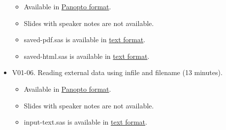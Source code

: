 \documentclass[
]{article}
\providecommand{\tightlist}{%
  \setlength{\itemsep}{0pt}\setlength{\parskip}{0pt}}
\begin{document}
\begin{itemize}
  \begin{itemize}
  \tightlist
  \item
    Available in
    \href{https://umkc.hosted.panopto.com/Panopto/Pages/Viewer.aspx?id=cebf1a98-06bf-41e0-9be1-aa7301384dc6}{Panopto
    format}.
  \item
    Slides with speaker notes are not available.
  \item
    saved-pdf.sas is available in
    \href{https://github.com/pmean/introduction-to-SAS/tree/master/basics1/src/saved-pdf.sas}{text
    format}.
  \item
    saved-html.sas is available in
    \href{https://github.com/pmean/introduction-to-SAS/tree/master/basics1/src/saved-html.sas}{text
    format}.
  \end{itemize}
\item
  V01-06. Reading external data using infile and filename (13 minutes).

  \begin{itemize}
  \tightlist
  \item
    Available in
    \href{https://umkc.hosted.panopto.com/Panopto/Pages/Viewer.aspx?id=faeefa60-c4ed-4d5b-a959-aa73013ea6af}{Panopto
    format}.
  \item
    Slides with speaker notes are not available.
  \item
    input-text.sas is available in
    \href{https://github.com/pmean/introduction-to-SAS/tree/master/basics1/src/input-text.sas}{text
    format}.
  \end{itemize}
\end{itemize}
\end{document}
